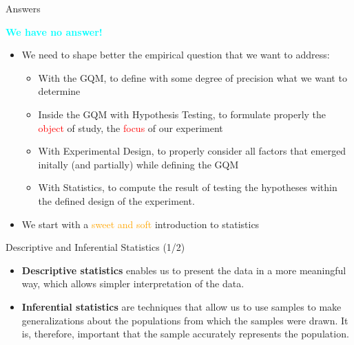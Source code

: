 \documentclass{beamer}
\begin{document}
\begin{frame}
{\centerline{Answers}}

\begin{center}
\Large
\textcolor{cyan}{\bf We have no answer!}
\end{center}
\begin{itemize}
\item We need to shape better the empirical question that we want to address:
\begin{itemize}
\item With the GQM, to define with some degree of precision what we want to determine
\item Inside the GQM with Hypothesis Testing, to formulate properly the \textcolor{red}{object} of study, the \textcolor{red}{focus}  of our experiment
\item With Experimental Design, to properly consider all factors that emerged initally (and partially) while defining the GQM
\item With Statistics, to compute the result of testing the hypotheses within the defined design of the experiment.
\end{itemize}

\item We start with a \textcolor{orange}{sweet and soft} introduction to statistics
\end{itemize}

\end{frame}



\begin{frame}
{\centerline{Descriptive and Inferential Statistics (1/2)}}

\begin{itemize}
\item  \textbf{Descriptive statistics} enables us to present the data in a more meaningful way, which allows simpler interpretation of the data.
\item \textbf{Inferential statistics} are techniques that allow us to use samples to make generalizations about the populations from which the samples were drawn. It is, therefore, important that the sample accurately represents the population.
\end{itemize}


\end{frame}
\end{document}
